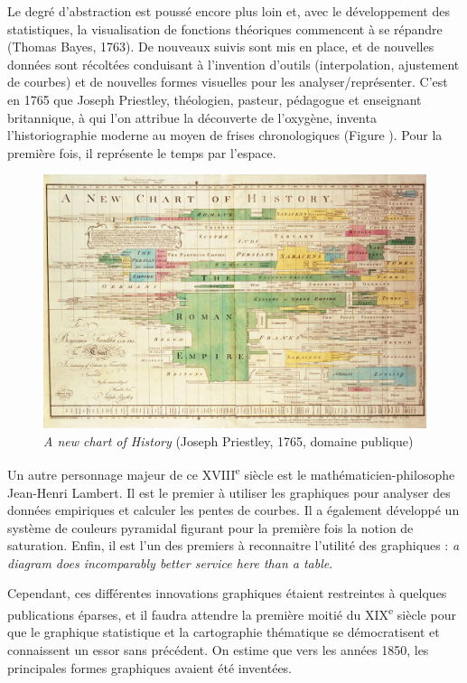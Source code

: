 \documentclass[]{article}
\begin{document}
Le degré d'abstraction est poussé encore plus loin et, avec le développement des statistiques, la visualisation de fonctions théoriques commencent à se répandre (Thomas Bayes, 1763). De nouveaux suivis sont mis en place, et de nouvelles données sont récoltées conduisant à l'invention d'outils (interpolation, ajustement de courbes) et de nouvelles formes visuelles pour les analyser/représenter. C'est en 1765 que Joseph Priestley, théologien, pasteur, pédagogue et enseignant britannique, à qui l'on attribue la découverte de l'oxygène, inventa l'historiographie moderne au moyen de frises chronologiques (Figure \citet{fig:priestley}). Pour la première fois, il représente le temps par l'espace.

\begin{figure}
\hypertarget{fig:priestley}{%
\centering
\includegraphics{img/chap1/priestley.jpg}
\caption{\emph{A new chart of History} (Joseph Priestley, 1765, domaine publique)}\label{fig:priestley}
}
\end{figure}

Un autre personnage majeur de ce XVIII\textsuperscript{e} siècle est le mathématicien-philosophe Jean-Henri Lambert. Il est le premier à utiliser les graphiques pour analyser des données empiriques et calculer les pentes de courbes. Il a également développé un système de couleurs pyramidal figurant pour la première fois la notion de saturation. Enfin, il est l'un des premiers à reconnaitre l'utilité des graphiques : \emph{a diagram does incomparably better service here than a table}.

Cependant, ces différentes innovations graphiques étaient restreintes à quelques publications éparses, et il faudra attendre la première moitié du XIX\textsuperscript{e} siècle pour que le graphique statistique et la cartographie thématique se démocratisent et connaissent un essor sans précédent. On estime que vers les années 1850, les principales formes graphiques avaient été inventées.
\end{document}
